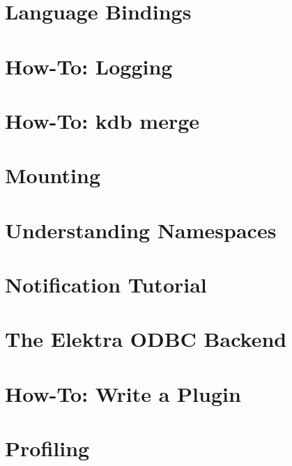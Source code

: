 \let\mypdfximage\pdfximage\def\pdfximage{\immediate\mypdfximage}\documentclass[twoside]{book}
\newcommand{\+}{\discretionary{\mbox{\scriptsize$\hookleftarrow$}}{}{}}
\begin{document}
\chapter{Language Bindings}
\label{doc_tutorials_language-bindings_md}

\chapter{How-\/\+To\+: Logging}
\label{doc_tutorials_logger_md}

\chapter{How-\/\+To\+: kdb merge}
\label{doc_tutorials_merge_md}

\chapter{Mounting}
\label{doc_tutorials_mount_md}

\chapter{Understanding Namespaces}
\label{doc_tutorials_namespaces_md}

\chapter{Notification Tutorial}
\label{doc_tutorials_notifications_md}

\chapter{The Elektra ODBC Backend}
\label{doc_tutorials_odbc-backend_md}

\chapter{How-\/\+To\+: Write a Plugin}
\label{doc_tutorials_plugins_md}

\chapter{Profiling}
\label{doc_tutorials_profiling_md}

\end{document}

